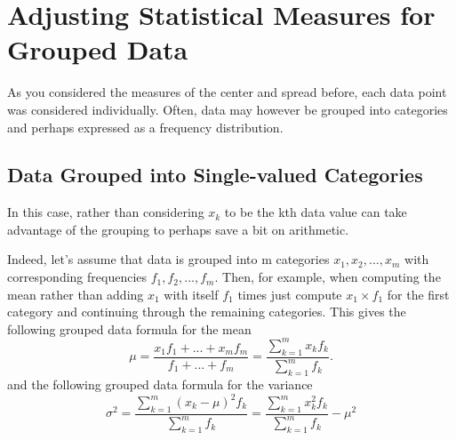 \documentclass[10pt,]{book}
\theoremstyle{plain}
\theoremstyle{definition}
\theoremstyle{definition}
\theoremstyle{definition}
\numberwithin{equation}{section}
\begin{document}
\section[{Adjusting Statistical Measures for Grouped Data}]{Adjusting Statistical Measures for Grouped Data}\label{section-6}
As you considered the measures of the center and spread before, each data point was considered individually. Often, data may however be grouped into categories and perhaps expressed as a frequency distribution. 
%
\typeout{************************************************}
\typeout{************************************************}
\subsection[{Data Grouped into Single-valued Categories}]{Data Grouped into Single-valued Categories}\label{subsection-1}
In this case, rather than considering \(x_k\) to be the kth data value can take advantage of the grouping to perhaps save a bit on arithmetic.%
\par
Indeed, let's assume that data is grouped into m categories \(x_1, x_2, ..., x_m\) with corresponding frequencies \(f_1, f_2, ..., f_m\). Then, for example, when computing the mean rather than adding \(x_1\) with itself \(f_1\) times just compute \(x_1 \times f_1\) for the first category and continuing through the remaining categories. This gives the following grouped data formula for the mean
		\begin{equation*}
		\mu = \frac{x_1 f_1 + ... + x_m f_m}{f_1 + ... + f_m} = \frac{\sum_{k=1}^m x_k f_k}{\sum_{k=1}^m f_k}.
		\end{equation*}
and the following grouped data formula for the variance
		\begin{equation*} 
		\sigma^2 = \frac{\sum_{k=1}^m ( x_k-\mu )^2 f_k}{\sum_{k=1}^m f_k} = \frac{\sum_{k=1}^m x_k^2 f_k}{\sum_{k=1}^m f_k} - \mu^2
		\end{equation*}
\end{document}
